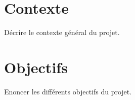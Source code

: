 \section{Contexte}

Décrire le contexte général du projet.

\section{Objectifs}

Enoncer les différents objectifs du projet.